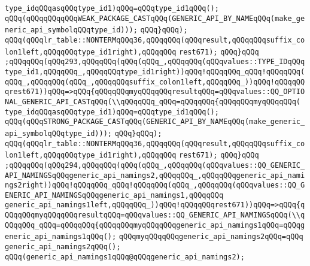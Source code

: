 \verb|type_idqQQqasqQQqtype_id1)qQQq=qQQqtype_id1qQQq();|\newline
\verb|qQQq(qQQqqQQqqQQqWEAK_PACKAGE_CASTqQQq(GENERIC_API_BY_NAMEqQQq(make_generic_api_symbolqQQqtype_id)));|\newline
\verb|qQQq}qQQq);|\newline
\verb|qQQq(qQQqlr_table::NONTERMqQQq36,qQQqqQQq(qQQqresult,qQQqqQQqsuffix_colon1left,qQQqqQQqtype_id1right),qQQqqQQq|\newline
\verb|rest671);|\newline
\verb|qQQq}qQQq|\newline
\verb|;qQQqqQQq(qQQq293,qQQqqQQq(qQQq(qQQq_,qQQqqQQq(qQQqvalues::TYPE_IDqQQqtype_id1,qQQqqQQq_,qQQqqQQqtype_id1right))qQQq!qQQqqQQq_qQQq!qQQqqQQq(qQQq_,qQQqqQQq(qQQq_,qQQqqQQqsuffix_colon1left,qQQqqQQq_))qQQq!qQQqqQQqrest671))qQQq=>qQQq{qQQqqQQqmyqQQqqQQqresultqQQq=qQQqvalues::QQ_OPTIONAL_GENERIC_API_CASTqQQq(\\qQQqqQQq_qQQq=qQQqqQQq{qQQqqQQqmyqQQqqQQq(|\newline
\verb|type_idqQQqasqQQqtype_id1)qQQq=qQQqtype_id1qQQq();|\newline
\verb|qQQq(qQQqSTRONG_PACKAGE_CASTqQQq(GENERIC_API_BY_NAMEqQQq(make_generic_api_symbolqQQqtype_id)));|\newline
\verb|qQQq}qQQq);|\newline
\verb|qQQq(qQQqlr_table::NONTERMqQQq36,qQQqqQQq(qQQqresult,qQQqqQQqsuffix_colon1left,qQQqqQQqtype_id1right),qQQqqQQq|\newline
\verb|rest671);|\newline
\verb|qQQq}qQQq|\newline
\verb|;qQQqqQQq(qQQq294,qQQqqQQq(qQQq(qQQq_,qQQqqQQq(qQQqvalues::QQ_GENERIC_API_NAMINGSqQQqgeneric_api_namings2,qQQqqQQq_,qQQqqQQqgeneric_api_namings2right))qQQq!qQQqqQQq_qQQq!qQQqqQQq(qQQq_,qQQqqQQq(qQQqvalues::QQ_GENERIC_API_NAMINGSqQQqgeneric_api_namings1,qQQqqQQq|\newline
\verb|generic_api_namings1left,qQQqqQQq_))qQQq!qQQqqQQqrest671))qQQq=>qQQq{qQQqqQQqmyqQQqqQQqresultqQQq=qQQqvalues::QQ_GENERIC_API_NAMINGSqQQq(\\qQQqqQQq_qQQq=qQQqqQQq{qQQqqQQqmyqQQqqQQqgeneric_api_namings1qQQq=qQQqgeneric_api_namings1qQQq();|\newline
\verb|qQQqmyqQQqqQQqgeneric_api_namings2qQQq=qQQq|\newline
\verb|generic_api_namings2qQQq();|\newline
\verb|qQQq(generic_api_namings1qQQq@qQQqgeneric_api_namings2);|\newline
